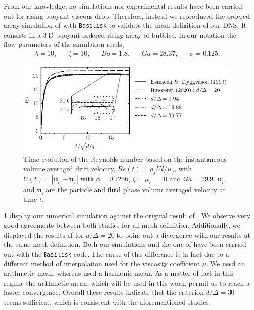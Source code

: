 From our knowledge, no simulations nor experimental results have been carried out for rising buoyant viscous drop. 
Therefore, instead we reproduced the ordered array simulation of \citet{esmaeeli1999direct} with \texttt{Basilisk} to validate the mesh definition of our DNS.  
It consists in a 3-D buoyant ordered rising array of bubbles. 
In our notation the flow parameters of the simulation reads, 
\begin{align*}
    \lambda = 10,
    && \zeta = 10,
    && Bo = 1.8,
    && Ga = 28.37,
    && \phi = 0.125.
\end{align*}
\begin{figure}[h!]
    \centering
    \includegraphics[height = 0.3\textwidth]{image/VALIDATION2.0/Loisy/Re.pdf}
    \caption{Time evolution of the Reynolds number based on the instantaneous volume averaged drift velocity, $Re(t) = \rho_fU d /\mu_f$, with $U(t) = |\textbf{u}_p - \textbf{u}_f|$ with $\phi = 0.1256$, $\zeta =\mu_r =10$ and $Ga = 29.9$.
    $\textbf{u}_p$ and $\textbf{u}_f$ are the particle and fluid phase volume averaged velocity at time $t$.}
    \label{fig:ordered_array}
\end{figure}
\ref{fig:ordered_array} display our numerical simulation against the original result of \citet{esmaeeli1999direct}.
We observe very good agreements between both studies for all mesh definition.
Additionally, we displayed the results of \citet{innocenti2020direct} for $d/\Delta = 20$ to point out a divergence with our results at the same mesh definition.  
Both our simulations and the one of \citet{innocenti2020direct} have been carried out with the  \texttt{Basilisk} code. 
The cause of this difference is in fact due to a different method of interpolation used for the viscosity coefficient $\mu$. 
We used an arithmetic mean, whereas \citet{innocenti2020direct} used a 
harmonic mean.
As a matter of fact in this regime the arithmetic mean, which will be used in this work, permit us to reach a faster convergence. 
Overall these results indicate that the criterion $d/\Delta = 30$ seems sufficient, which is consistent with the aforementioned studies.


